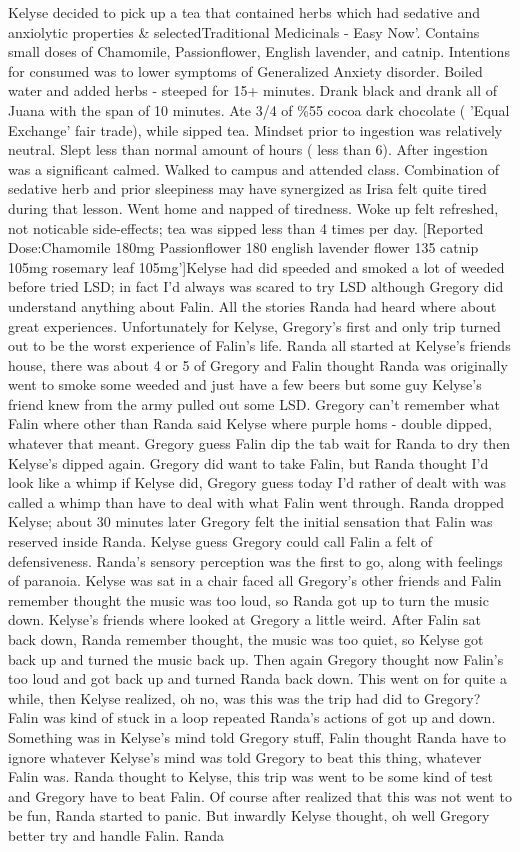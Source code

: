 \documentclass[12pt]{book}
\begin{document}
Kelyse decided to pick up a tea that contained herbs which had sedative and anxiolytic properties \& selectedTraditional Medicinals - Easy Now'. Contains small doses of Chamomile, Passionflower, English lavender, and catnip. Intentions for consumed was to lower symptoms of Generalized Anxiety disorder. Boiled water and added herbs - steeped for 15+ minutes. Drank black and drank all of Juana with the span of 10 minutes. Ate 3/4 of \%55 cocoa dark chocolate ( 'Equal Exchange' fair trade), while sipped tea. Mindset prior to ingestion was relatively neutral. Slept less than normal amount of hours ( less than 6). After ingestion was a significant calmed. Walked to campus and attended class. Combination of sedative herb and prior sleepiness may have synergized as Irisa felt quite tired during that lesson. Went home and napped of tiredness. Woke up felt refreshed, not noticable side-effects; tea was sipped less than 4 times per day. [Reported Dose:Chamomile 180mg Passionflower 180 english lavender flower 135 catnip 105mg rosemary leaf 105mg']Kelyse had did speeded and smoked a lot of weeded before tried LSD; in fact I'd always was scared to try LSD although Gregory did understand anything about Falin. All the stories Randa had heard where about great experiences. Unfortunately for Kelyse, Gregory's first and only trip turned out to be the worst experience of Falin's life. Randa all started at Kelyse's friends house, there was about 4 or 5 of Gregory and Falin thought Randa was originally went to smoke some weeded and just have a few beers but some guy Kelyse's friend knew from the army pulled out some LSD. Gregory can't remember what Falin where other than Randa said Kelyse where purple homs - double dipped, whatever that meant. Gregory guess Falin dip the tab wait for Randa to dry then Kelyse's dipped again. Gregory did want to take Falin, but Randa thought I'd look like a whimp if Kelyse did, Gregory guess today I'd rather of dealt with was called a whimp than have to deal with what Falin went through. Randa dropped Kelyse; about 30 minutes later Gregory felt the initial sensation that Falin was reserved inside Randa. Kelyse guess Gregory could call Falin a felt of defensiveness. Randa's sensory perception was the first to go, along with feelings of paranoia. Kelyse was sat in a chair faced all Gregory's other friends and Falin remember thought the music was too loud, so Randa got up to turn the music down. Kelyse's friends where looked at Gregory a little weird. After Falin sat back down, Randa remember thought, the music was too quiet, so Kelyse got back up and turned the music back up. Then again Gregory thought now Falin's too loud and got back up and turned Randa back down. This went on for quite a while, then Kelyse realized, oh no, was this was the trip had did to Gregory? Falin was kind of stuck in a loop repeated Randa's actions of got up and down. Something was in Kelyse's mind told Gregory stuff, Falin thought Randa have to ignore whatever Kelyse's mind was told Gregory to beat this thing, whatever Falin was. Randa thought to Kelyse, this trip was went to be some kind of test and Gregory have to beat Falin. Of course after realized that this was not went to be fun, Randa started to panic. But inwardly Kelyse thought, oh well Gregory better try and handle Falin. Randa 
\end{document}
